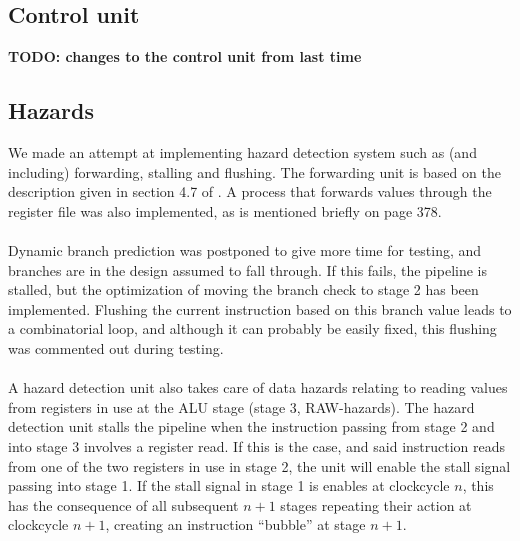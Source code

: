\subsection{Control unit}
\textbf{TODO: changes to the control unit from last time}
\subsection{Hazards}
We made an attempt at implementing hazard detection system such as (and
including) forwarding, stalling and flushing. The forwarding unit is based on
the description given in section 4.7 of \cite{patterson12}. A process that
forwards values through the register file was also implemented, as is mentioned
briefly on page 378.
\paragraph*{}
Dynamic branch prediction was postponed to give more time for testing, and
branches are in the design assumed to fall through. If this fails, the pipeline
is stalled, but the optimization of moving the branch check to stage 2 has been
implemented. Flushing the current instruction based on this branch value leads
to a combinatorial loop, and although it can probably be easily fixed, this
flushing was commented out during testing.
\paragraph*{}
A hazard detection unit also takes care of data hazards relating to reading
values from registers in use at the ALU stage (stage 3, RAW-hazards). The
hazard detection unit stalls the pipeline when the instruction passing from
stage 2 and into stage 3 involves a register read. If this is the case, and said
instruction reads from one of the two registers in use in stage 2, the unit will
enable the stall signal passing into stage 1. If the stall signal in stage 1 is
enables at clockcycle $n$, this has the consequence of all subsequent $n+1$
stages repeating their action at clockcycle $n+1$, creating an instruction
``bubble'' at stage $n+1$.
